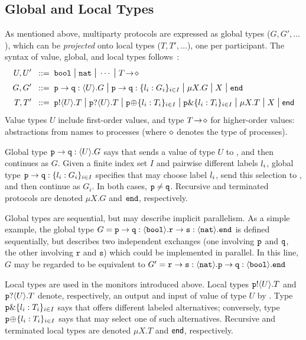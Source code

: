 \documentclass[runningheads,plain]{llncs}
\begin{document}
\subsection{Global and Local Types}
\label{ss:types}
As  mentioned above,  multiparty protocols are expressed as global types ($G, G', \ldots$), which can be \emph{projected} onto local types  ($T, T', \ldots$), one per participant. The syntax 
of value, global, and local types
follows~\cite{DBLP:conf/popl/HondaYC08}:
\begin{align*}
			U, U'  \bnfis & \bool \sbnfbar \nat \sbnfbar \cdots %
			\sbnfbar \shot{T} \\
			G, G'  \bnfis & \gtcom{p}{q}{U}{G} %
			\sbnfbar
			\gtcho{p}{q}{\lbl_i}{G_i} %
			\sbnfbar %
			\mu X. G \sbnfbar X \sbnfbar \gend \\
	    	T, T'  \bnfis & \ltout{p}{U}{T} \sbnfbar \ltinp{p}{U}{T} %
		  \sbnfbar %
		  \ltsel{p}{\lbl_i}{T_i}{i}{I} \sbnfbar \ltbra{p}{\lbl_i}{T_i}{i}{I}  
		\sbnfbar  \mu X. T \sbnfbar X \sbnfbar \lend 
\end{align*}
\noindent
Value types $U$ include first-order values,   and  
 type $T\! \rightarrow\! \diamond$ for {higher-order} values: abstractions from names to processes
(where $\diamond$ denotes the type of processes).

Global type $\mathtt{p}\to\mathtt{q}:\langle U\rangle.G$ says that \p  sends a value of type $U$ to \q, and then continues as $G$.
Given a finite index set $I$ and pairwise different {labels} $l_i$, global type $\mathtt{p}\to\mathtt{q}:\{l_i:G_i\}_{i \in I}$ specifies that  \p may choose  label $l_i$, send this selection to \q, and then continue as $G_i$.
In both cases, $\mathtt{p} \neq \mathtt{q}$.
Recursive and terminated protocols are denoted $\mu X. G$ and $\mathtt{end}$, respectively.

Global types are sequential, but may describe implicit parallelism. 
As a simple example, the global type $G = \mathtt{p}\to\mathtt{q}:\langle \mathtt{bool}\rangle.\mathtt{r}\to\mathtt{s}:\langle \mathtt{nat}\rangle.\mathtt{end}$
is defined sequentially, but describes two independent  exchanges 
(one involving $\mathtt{p}$ and $\mathtt{q}$, the other involving $\mathtt{r}$ and $\mathtt{s}$)
which could be implemented in parallel.
In this line, $G$ may be regarded to be equivalent to 
$G' = \mathtt{r}\to\mathtt{s}:\langle \mathtt{nat}\rangle.\mathtt{p}\to\mathtt{q}:\langle \mathtt{bool}\rangle.\mathtt{end}$

Local types are used in the monitors introduced above. 
Local types
$\mathtt{p}!\langle U\rangle.T$ and $\mathtt{p}?\langle U\rangle.T$ denote, respectively, an output and input of value of type $U$ by \p.
Type $\mathtt{p}\&\{l_i: T_i\}_{i \in I}$ says that \p 
offers different labeled alternatives;
conversely, type $\mathtt{\mathtt{p}}\!\oplus\!\{l_i: T_i\}_{i \in I}$ 
says that \p may select one of such alternatives.
Recursive and terminated local types are denoted $\mu X. T$ and $\mathsf{end}$, respectively. 
 
\end{document}
